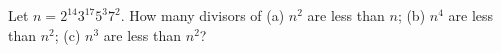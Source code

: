 Let $n=2^{14}3^{17}5^3 7^2$. How many divisors of (a) $n^2$ are less than $n$; (b) $n^4$ are less than $n^2$; (c) $n^3$ are less than $n^2$?

